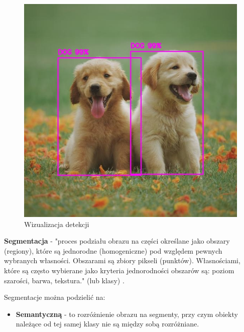 \begin{description}
    \begin{figure}[h!]
    \begin{center}
        \includegraphics[scale=0.6]{img/detekcja.jpg}
    \end{center}
    \caption{Wizualizacja detekcji\protect\footnotemark}
    \label{fig:detection}
    \end{figure}
    

\pagebreak

\item \textbf{Segmentacja} - "proces podziału obrazu na części określane jako obszary (regiony), które są jednorodne (homogeniczne) pod względem pewnych wybranych własności. Obszarami są zbiory pikseli (punktów). Własnościami, które są często wybierane jako kryteria jednorodności obszarów są: poziom szarości, barwa, tekstura." (lub klasy) \cite{wikiseg}.

Segmentacje można podzielić na:
    \begin{itemize}
        
        \item \textbf{Semantyczną} - to rozróżnienie obrazu na segmenty, przy czym obiekty należące od tej samej klasy nie są między sobą rozróżniane. 
        

\end{itemize}
\end{description}
